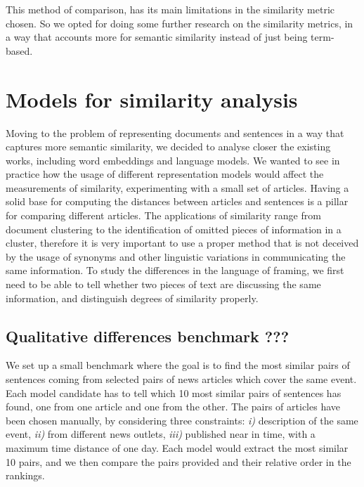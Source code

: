 This method of comparison, has its main limitations in the similarity metric chosen. So we opted for doing some further research on the similarity metrics, in a way that accounts more for semantic similarity instead of just being term-based.


\section{Models for similarity analysis}
\label{sec:cgs_similarity}
Moving to the problem of representing documents and sentences in a way that captures more semantic similarity, we decided to analyse closer the existing works, including word embeddings and language models.
We wanted to see in practice how the usage of different representation models would affect the measurements of similarity, experimenting with a small set of articles. 
Having a solid base for computing the distances between articles and sentences is a pillar for comparing different articles. The applications of similarity range from document clustering to the identification of omitted pieces of information in a cluster, therefore it is very important to use a proper method that is not deceived by the usage of synonyms and other linguistic variations in communicating the same information. To study the differences in the language of framing, we first need to be able to tell whether two pieces of text are discussing the same information, and distinguish degrees of similarity properly.


\subsection{Qualitative differences benchmark ???}
We set up a small benchmark where the goal is to find the most similar pairs of sentences coming from selected pairs of news articles which cover the same event. Each model candidate has to tell which 10 most similar pairs of sentences has found, one from one article and one from the other.
The pairs of articles have been chosen manually, by considering three constraints: \textit{i)} description of the same event, \textit{ii)} from different news outlets, \textit{iii)} published near in time, with a maximum time distance of one day.
Each model would extract the most similar 10 pairs, and we then compare the pairs provided and their relative order in the rankings.

